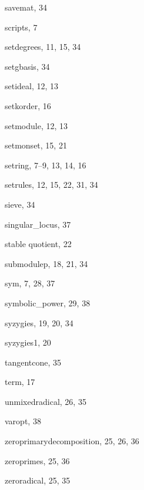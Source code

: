 \begin{theindex}
  \indexspace

  \item savemat, 34
  \item scripts, 7
  \item setdegrees, 11, 15, 34
  \item setgbasis, 34
  \item setideal, 12, 13
  \item setkorder, 16
  \item setmodule, 12, 13
  \item setmonset, 15, 21
  \item setring, 7--9, 13, 14, 16
  \item setrules, 12, 15, 22, 31, 34
  \item sieve, 34
  \item singular\_locus, 37
  \item stable quotient, 22
  \item submodulep, 18, 21, 34
  \item sym, 7, 28, 37
  \item symbolic\_power, 29, 38
  \item syzygies, 19, 20, 34
  \item syzygies1, 20

  \indexspace

  \item tangentcone, 35
  \item term, 17

  \indexspace

  \item unmixedradical, 26, 35

  \indexspace

  \item varopt, 38

  \indexspace

  \item zeroprimarydecomposition, 25, 26, 36
  \item zeroprimes, 25, 36
  \item zeroradical, 25, 35

\end{theindex}
\pagebreak

